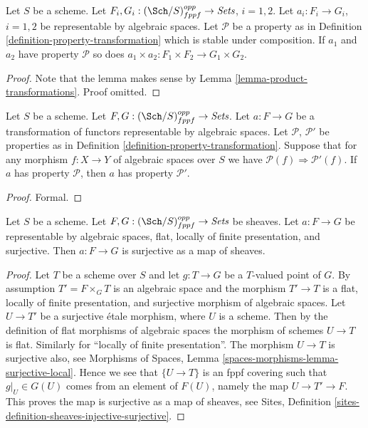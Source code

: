 \begin{lemma}
\label{lemma-product-transformations-property}
Let $S$ be a scheme.
Let $F_i, G_i : (\Sch/S)_{fppf}^{opp} \to \textit{Sets}$,
$i = 1, 2$.
Let $a_i : F_i \to G_i$, $i = 1, 2$ be representable by algebraic spaces.
Let $\mathcal{P}$ be a property as in
Definition \ref{definition-property-transformation}
which is stable under composition.
If $a_1$ and $a_2$ have property $\mathcal{P}$ so does
$a_1 \times a_2 : F_1 \times F_2 \longrightarrow G_1 \times G_2$.
\end{lemma}

\begin{proof}
Note that the lemma makes sense by
Lemma \ref{lemma-product-transformations}.
Proof omitted.
\end{proof}

\begin{lemma}
\label{lemma-transformations-property-implication}
Let $S$ be a scheme.
Let $F, G : (\Sch/S)_{fppf}^{opp} \to \textit{Sets}$.
Let $a : F \to G$ be a transformation of functors representable by
algebraic spaces.
Let $\mathcal{P}$, $\mathcal{P}'$ be properties as in
Definition \ref{definition-property-transformation}.
Suppose that for any morphism $f : X \to Y$ of algebraic spaces over $S$
we have $\mathcal{P}(f) \Rightarrow \mathcal{P}'(f)$.
If $a$ has property $\mathcal{P}$, then
$a$ has property $\mathcal{P}'$.
\end{lemma}

\begin{proof}
Formal.
\end{proof}

\begin{lemma}
\label{lemma-surjective-flat-locally-finite-presentation}
Let $S$ be a scheme.
Let $F, G : (\Sch/S)_{fppf}^{opp} \to \textit{Sets}$ be sheaves.
Let $a : F \to G$ be representable by algebraic spaces, flat,
locally of finite presentation, and surjective.
Then $a : F \to G$ is surjective as a map of sheaves.
\end{lemma}

\begin{proof}
Let $T$ be a scheme over $S$ and let $g : T \to G$ be a $T$-valued point of
$G$. By assumption $T' = F \times_G T$ is an algebraic space and
the morphism $T' \to T$ is a flat, locally of finite presentation, and
surjective morphism of algebraic spaces.
Let $U \to T'$ be a surjective \'etale morphism, where $U$ is a scheme.
Then by the definition of flat morphisms of algebraic spaces
the morphism of schemes $U \to T$ is flat. Similarly for
``locally of finite presentation''. The morphism $U \to T$ is surjective
also, see
Morphisms of Spaces, Lemma \ref{spaces-morphisms-lemma-surjective-local}.
Hence we see that $\{U \to T\}$ is an fppf covering such
that $g|_U \in G(U)$ comes from an element of $F(U)$, namely
the map $U \to T' \to F$. This proves the map is surjective as
a map of sheaves, see
Sites, Definition \ref{sites-definition-sheaves-injective-surjective}.
\end{proof}




